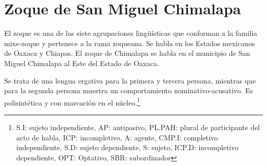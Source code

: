 \section*{Zoque de San Miguel Chimalapa}

\noindent El zoque es una de las siete agrupaciones lingüísticas que conforman a la familia mixe-zoque y pertenece a la rama zoqueana. Se habla en los Estados mexicanos de Oaxaca y Chiapas. El zoque de Chimalapa se habla en el municipio de San Miguel Chimalapa al Este del Estado de Oaxaca.

Se trata de una lengua ergativa para la primera y tercera persona, mientras que para la segunda persona muestra un comportamiento nominativo-acusativo. Es polisintética y con marcación en el núcleo.\footnote{S.I: sujeto independiente, AP: antipasivo, PL.PAH: plural de participante del acto de habla, ICP: incompletivo, A: agente, CMP.I: completivo independiente, S.D: sujeto dependiente, S: sujeto, ICP.D: incompletivo dependiente, OPT: Optativo, SBR: subordinador}  \vspace{0.5cm}

